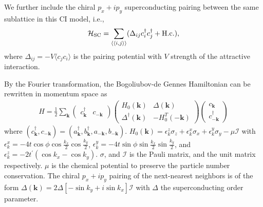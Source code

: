 \documentclass[12pt]{iopart}
\begin{document}
We further include the chiral $p_{x}+ip_{y}$ superconducting pairing between the same sublattice in this CI model, i.e.,
\begin{equation}
\mathcal{H}_{\rm SC}=\sum_{\langle\langle i,j\rangle\rangle}(\Delta_{ij}c_{i}^{\dagger}c_{j}^{\dagger}+ {\rm H.c.}),
\label{E.1}
\end{equation}
where $\Delta_{ij}=-V\langle c_{j}c_{i}\rangle$ is the pairing potential
with $V$ strength of the attractive interaction.

By the Fourier transformation, the Bogoliubov-de Gennes Hamiltonian can be rewritten in momentum space as
\begin{eqnarray}
    H=\frac{1}{2}\sum_{\bm{k}}\left(
                              \begin{array}{ccc}
                              c_{\bm{k}}^{\dagger} &
                              c_{\bm{-k}}
                              \end{array}
                              \right)
                              \left(
                              \begin{array}{ccc}
                              H_{0}(\bm{k}) & \Delta(\bm{k})\\
                              \Delta^{\dagger}(\bm{k}) & -H_{0}^{T}(-\bm{k})
                              \end{array}
                              \right)
                              \left(
                              \begin{array}{ccc}
                              c_{\bm{k}}\\
                              c_{\bm{-k}}^{\dagger}
                              \end{array}
                              \right)
\label{E.2}
\end{eqnarray}
where $\left(c_{\bm{k}}^{\dagger}, c_{\bm{-k}}\right) = \left( a_{
\bm{k}}^{\dagger}, b_{\bm{k}}^{\dagger}, a_{\bm{-k}}, b_{\bm{-k}} \right)$. $H_{0}(\bm{k})=\epsilon_{k}^{z}\sigma_{z}+\epsilon_{k}^{x}\sigma_{x}+\epsilon_{k}^{y}\sigma_{y}-\mu
\mathcal{I}$ with $\epsilon_{k}^{x}=-4t\cos
\phi\cos\frac{k_{x}}{2}\cos\frac{k_{y}}{2}$, $\epsilon_{k}^{y}=-4t\sin
\phi\sin\frac{k_{x}}{2}\sin\frac{k_{y}}{2}$, and
$\epsilon_{k}^{z}=-2t^{\prime}(\cos k_{x}-\cos k_{y})$. $\sigma$, and
$\mathcal{I}$ is the Pauli matrix, and the unit matrix respectively. $\mu$ is the chemical potential to preserve the particle number conservation. The chiral
$p_{x}+ip_{y}$ pairing of the next-nearest neighbors is of the form
$\Delta(\bm{k})=2\Delta[-\sin k_{y}+i\sin k_{x}]\mathcal{I}$
with $\Delta$ the superconducting order parameter.  %
\end{document}
